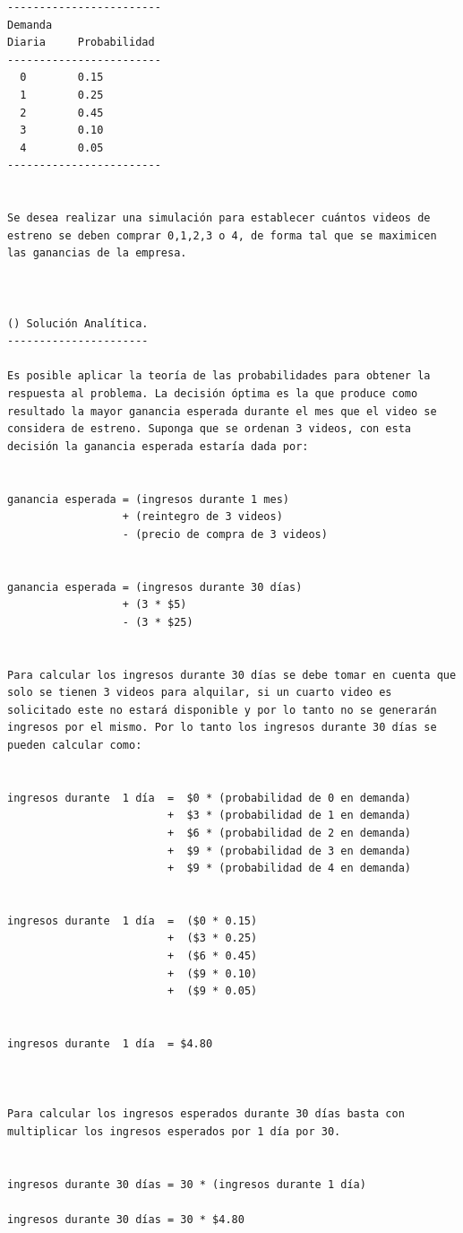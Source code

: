 \begin{verbatim}
------------------------
Demanda
Diaria     Probabilidad
------------------------
  0        0.15
  1        0.25
  2        0.45
  3        0.10
  4        0.05
------------------------


Se desea realizar una simulación para establecer cuántos videos de estreno se deben comprar 0,1,2,3 o 4, de forma tal que se maximicen las ganancias de la empresa.



() Solución Analítica.
----------------------

Es posible aplicar la teoría de las probabilidades para obtener la respuesta al problema. La decisión óptima es la que produce como resultado la mayor ganancia esperada durante el mes que el video se considera de estreno. Suponga que se ordenan 3 videos, con esta decisión la ganancia esperada estaría dada por:


ganancia esperada = (ingresos durante 1 mes)
                  + (reintegro de 3 videos)
                  - (precio de compra de 3 videos)


ganancia esperada = (ingresos durante 30 días)
                  + (3 * $5)
                  - (3 * $25)


Para calcular los ingresos durante 30 días se debe tomar en cuenta que solo se tienen 3 videos para alquilar, si un cuarto video es solicitado este no estará disponible y por lo tanto no se generarán ingresos por el mismo. Por lo tanto los ingresos durante 30 días se pueden calcular como:


ingresos durante  1 día  =  $0 * (probabilidad de 0 en demanda)
                         +  $3 * (probabilidad de 1 en demanda)
                         +  $6 * (probabilidad de 2 en demanda)
                         +  $9 * (probabilidad de 3 en demanda) 
                         +  $9 * (probabilidad de 4 en demanda)


ingresos durante  1 día  =  ($0 * 0.15)
                         +  ($3 * 0.25)
                         +  ($6 * 0.45)
                         +  ($9 * 0.10)
                         +  ($9 * 0.05)


ingresos durante  1 día  = $4.80



Para calcular los ingresos esperados durante 30 días basta con multiplicar los ingresos esperados por 1 día por 30.


ingresos durante 30 días = 30 * (ingresos durante 1 día)

ingresos durante 30 días = 30 * $4.80


\end{verbatim}
